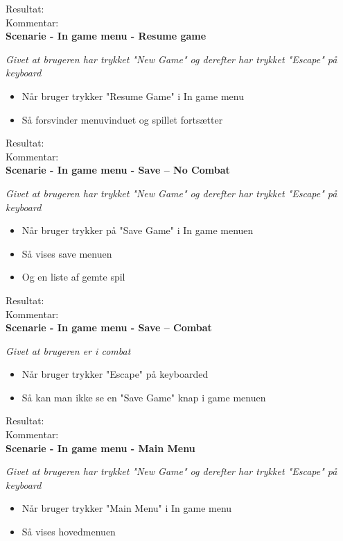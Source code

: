 Resultat:\\
Kommentar:\\

\textbf{Scenarie - In game menu - Resume game}

\textit{Givet at brugeren har trykket "New Game" og derefter har trykket "Escape" på keyboard}

\begin{itemize}
  \item Når bruger trykker "Resume Game" i In game menu
  \item Så forsvinder menuvinduet og spillet fortsætter
\end{itemize}

Resultat:\\
Kommentar:\\

\textbf{Scenarie - In game menu - Save -- No Combat}

\textit{Givet at brugeren har trykket "New Game" og derefter har trykket "Escape" på keyboard}

\begin{itemize}
  \item Når bruger trykker på "Save Game" i In game menuen
  \item Så vises save menuen
  \item Og en liste af gemte spil
\end{itemize}

Resultat:\\
Kommentar:\\

\textbf{Scenarie - In game menu - Save -- Combat}

\textit{Givet at brugeren er i combat}

\begin{itemize}
  \item Når bruger trykker "Escape" på keyboarded
  \item Så kan man ikke se en "Save Game" knap i game menuen
\end{itemize}

Resultat:\\
Kommentar:\\

\textbf{Scenarie - In game menu - Main Menu}

\textit{Givet at brugeren har trykket "New Game" og derefter har trykket "Escape" på keyboard}

\begin{itemize}
  \item Når bruger trykker "Main Menu" i In game menu
  \item Så vises hovedmenuen
\end{itemize}

